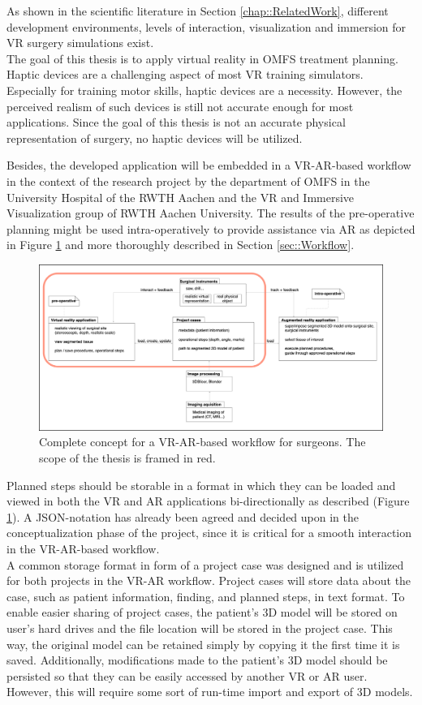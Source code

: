 As shown in the scientific literature in Section \ref{chap::RelatedWork}, different development environments, levels of interaction, visualization and immersion for VR surgery simulations exist.
\\ The goal of this thesis is to apply virtual reality in OMFS treatment planning.
Haptic devices are a challenging aspect of most VR training simulators.
Especially for training motor skills, haptic devices are a necessity.
However, the perceived realism of such devices is still not accurate enough for most applications.
Since the goal of this thesis is not an accurate physical representation of surgery, no haptic devices will be utilized.

Besides, the developed application will be embedded in a VR-AR-based workflow in the context of the research project by the department of OMFS in the University 
Hospital of the RWTH Aachen and the VR and Immersive Visualization group of RWTH Aachen University.
The results of the pre-operative planning might be used intra-operatively to provide assistance via AR as depicted in Figure \ref{fig::ProjectPlan} and more thoroughly described in Section \ref{sec::Workflow}.
\begin{figure}
    \centering
    \includegraphics[width=\linewidth]{images/project_plan.png}
    \caption{\label{fig::ProjectPlan} Complete concept for a VR-AR-based workflow for surgeons. The scope of the thesis is framed in red.}
\end{figure}
Planned steps should be storable in a format in which they can be loaded and viewed in both the VR and AR applications bi-directionally as described (Figure \ref{fig::ProjectPlan}).
A JSON-notation has already been agreed and decided upon in the conceptualization phase of the project, since it is critical for a smooth 
interaction in the VR-AR-based workflow.
\\ A common storage format in form of a project case was designed and is utilized for both projects in the VR-AR workflow.
Project cases will store data about the case, such as patient information, finding, and planned steps, in text format.
To enable easier sharing of project cases, the patient's 3D model will be stored on user's hard drives and the file location will be stored in the project case. 
This way, the original model can be retained simply by copying it the first time it is saved.
Additionally, modifications made to the patient's 3D model should be persisted so that they can be easily accessed by another VR or AR user. 
However, this will require some sort of run-time import and export of 3D models.

